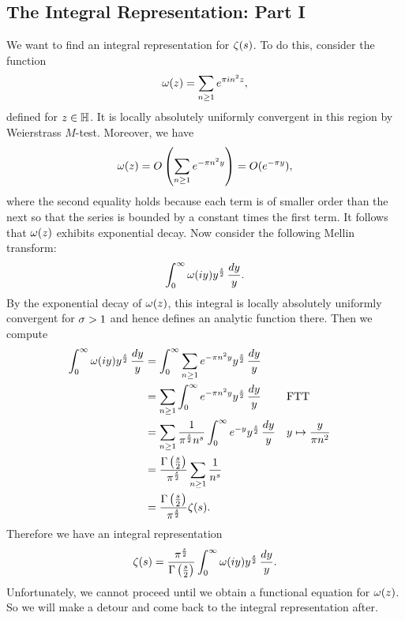     \subsection*{The Integral Representation: Part I}
      We want to find an integral representation for $\zeta(s)$. To do this, consider the function
      \[
        \omega(z) = \sum_{n \ge 1}e^{\pi in^{2}z},
      \]
      defined for $z \in \mathbb{H}$. It is locally absolutely uniformly convergent in this region by Weierstrass $M$-test. Moreover, we have
      \[
        \omega(z) = O\left(\sum_{n \ge 1}e^{-\pi n^{2}y}\right) = O(e^{-\pi y}),
      \]
      where the second equality holds because each term is of smaller order than the next so that the series is bounded by a constant times the first term. It follows that $\omega(z)$ exhibits exponential decay. Now consider the following Mellin transform:
      \[
        \int_{0}^{\infty}\omega(iy)y^{\frac{s}{2}}\,\frac{dy}{y}.
      \]
      By the exponential decay of $\omega(z)$, this integral is locally absolutely uniformly convergent for $\sigma > 1$ and hence defines an analytic function there. Then we compute
      \begin{align*}
        \int_{0}^{\infty}\omega(iy)y^{\frac{s}{2}}\,\frac{dy}{y} &= \int_{0}^{\infty}\sum_{n \ge 1}e^{-\pi n^{2}y}y^{\frac{s}{2}}\,\frac{dy}{y} \\
        &= \sum_{n \ge 1}\int_{0}^{\infty}e^{-\pi n^{2}y}y^{\frac{s}{2}}\,\frac{dy}{y} && \text{FTT} \\
        &= \sum_{n \ge 1}\frac{1}{\pi^{\frac{s}{2}}n^{s}}\int_{0}^{\infty}e^{-y}y^{\frac{s}{2}}\,\frac{dy}{y} && \text{$y \mapsto \frac{y}{\pi n^{2}}$} \\
        &= \frac{\Gamma\left(\frac{s}{2}\right)}{\pi^{\frac{s}{2}}}\sum_{n \ge 1}\frac{1}{n^{s}} \\
        &= \frac{\Gamma\left(\frac{s}{2}\right)}{\pi^{\frac{s}{2}}}\zeta(s).
      \end{align*}
      Therefore we have an integral representation
      \begin{equation}\label{equ:integral_representation_zeta_1}
        \zeta(s) = \frac{\pi^{\frac{s}{2}}}{\Gamma\left(\frac{s}{2}\right)}\int_{0}^{\infty}\omega(iy)y^{\frac{s}{2}}\,\frac{dy}{y}.
      \end{equation}
      Unfortunately, we cannot proceed until we obtain a functional equation for $\omega(z)$. So we will make a detour and come back to the integral representation after.
